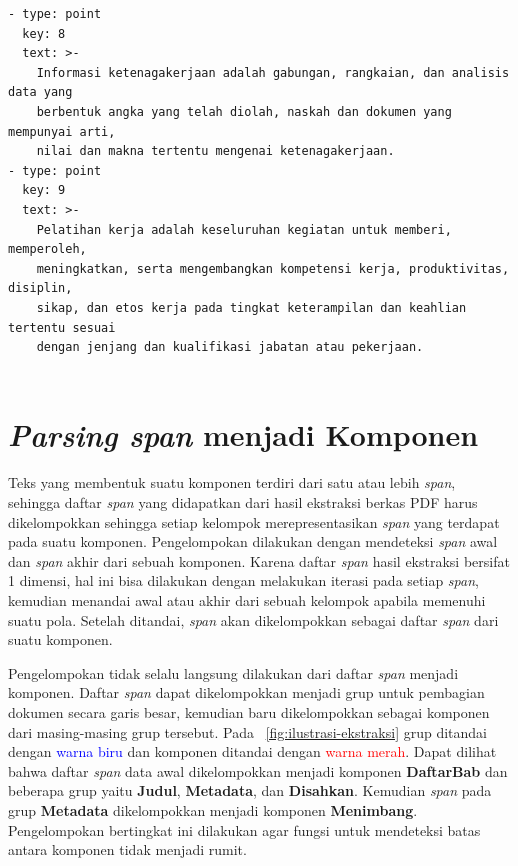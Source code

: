 \begin{listing}[H]
  \begin{verbatim}
- type: point
  key: 8
  text: >-
    Informasi ketenagakerjaan adalah gabungan, rangkaian, dan analisis data yang
    berbentuk angka yang telah diolah, naskah dan dokumen yang mempunyai arti,
    nilai dan makna tertentu mengenai ketenagakerjaan.
- type: point
  key: 9
  text: >-
    Pelatihan kerja adalah keseluruhan kegiatan untuk memberi, memperoleh,
    meningkatkan, serta mengembangkan kompetensi kerja, produktivitas, disiplin,
    sikap, dan etos kerja pada tingkat keterampilan dan keahlian tertentu sesuai
    dengan jenjang dan kualifikasi jabatan atau pekerjaan.
  
\end{verbatim}
  \caption{Data jika nomor 9 terpindai dalam format yaml}
  \label{lst:no-9-terpindai}
\end{listing}

\section{\textit{Parsing span} menjadi Komponen}
\label{pengelompokan-span-menjadi-komponen}


Teks yang membentuk suatu komponen terdiri dari satu atau lebih \textit{span}, sehingga daftar
\textit{span} yang didapatkan dari hasil ekstraksi berkas PDF harus dikelompokkan sehingga setiap
kelompok merepresentasikan \textit{span} yang terdapat pada suatu komponen. Pengelompokan dilakukan
dengan mendeteksi \textit{span} awal dan \textit{span} akhir dari sebuah komponen. Karena daftar
\textit{span} hasil ekstraksi bersifat 1 dimensi, hal ini bisa dilakukan dengan melakukan iterasi
pada setiap \textit{span}, kemudian menandai awal atau akhir dari sebuah kelompok apabila memenuhi
suatu pola. Setelah ditandai, \textit{span} akan dikelompokkan sebagai daftar \textit{span} dari
suatu komponen.

Pengelompokan tidak selalu langsung dilakukan dari daftar \textit{span} menjadi komponen. Daftar
\textit{span} dapat dikelompokkan menjadi grup untuk pembagian dokumen secara garis besar, kemudian
baru dikelompokkan sebagai komponen dari masing-masing grup tersebut. Pada
\pic~\ref{fig:ilustrasi-ekstraksi} grup ditandai dengan \textcolor{blue}{warna biru} dan komponen
ditandai dengan \textcolor{red}{warna merah}. Dapat dilihat bahwa daftar \textit{span} data awal
dikelompokkan menjadi komponen \textbf{DaftarBab} dan beberapa grup yaitu \textbf{Judul},
\textbf{Metadata}, dan \textbf{Disahkan}. Kemudian \textit{span} pada grup \textbf{Metadata} dikelompokkan
menjadi komponen \textbf{Menimbang}. Pengelompokan bertingkat ini dilakukan agar fungsi untuk
mendeteksi batas antara komponen tidak menjadi rumit.

